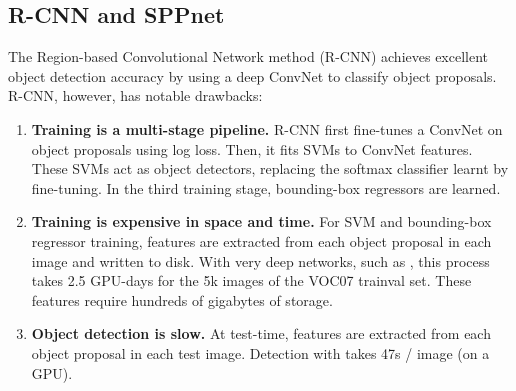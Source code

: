 
\subsection{R-CNN and SPPnet}
The Region-based Convolutional Network method (R-CNN) \cite{girshick2014rcnn} achieves excellent object detection accuracy by using a deep ConvNet to classify object proposals.
R-CNN, however, has notable drawbacks:
\begin{enumerate}
\itemsep0em
\item {\bf Training is a multi-stage pipeline.}
R-CNN first fine-tunes a ConvNet on object proposals using log loss.
Then, it fits SVMs to ConvNet features.
These SVMs act as object detectors, replacing the softmax classifier learnt by fine-tuning.
In the third training stage, bounding-box regressors are learned.
\item {\bf Training is expensive in space and time.}
For SVM and bounding-box regressor training, features are extracted from each object proposal in each image and written to disk.
With very deep networks, such as \vggsixteen, this process takes 2.5 GPU-days for the 5k images of the VOC07 trainval set.
These features require hundreds of gigabytes of storage.
\item {\bf Object detection is slow.}
At test-time, features are extracted from each object proposal in each test image.
Detection with \vggsixteen takes 47s / image (on a GPU).
\end{enumerate}

